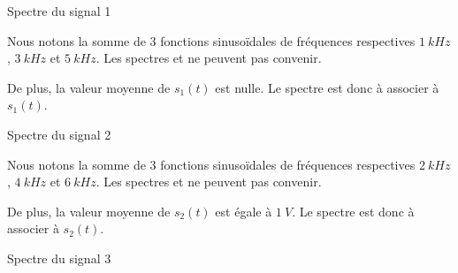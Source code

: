 \smallskip

\debutEntrainement

\begin{enonce}
	Spectre du signal \no{}1
\end{enonce}

\reponse{$\reponseC{}$}

\begin{corrige}
	Nous notons la somme de 3 fonctions sinusoïdales de fréquences respectives $\SI{1}{kHz}$, $\SI{3}{kHz}$ et 
	$\SI{5}{kHz}$. Les spectres \reponseA{} et \reponseD{} ne peuvent pas convenir. 
	
	De plus, la valeur moyenne de $s_1(t)$ est nulle. Le spectre \reponseC{} est donc à associer à $s_1(t)$.
\end{corrige}



\begin{enonce}
	Spectre du signal \no{}2
\end{enonce}

\reponse{$\reponseA{}$}


\begin{corrige}
	Nous notons la somme de 3 fonctions sinusoïdales de fréquences respectives $\SI{2}{kHz}$, $\SI{4}{kHz}$ et $\SI{6}{kHz}$. Les spectres \reponseB{} et \reponseC{} ne peuvent pas convenir. 
	
	De plus, la valeur moyenne de $s_2(t)$ est égale à $\SI{1}{V}$. Le spectre \reponseA{} est donc à associer à  $s_2(t)$.
\end{corrige}



\begin{enonce}
	Spectre du signal \no{}3
\end{enonce}

\reponse{$\reponseD{}$}

